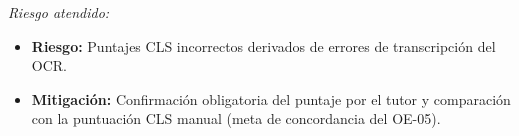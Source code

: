 \textit{Riesgo atendido:}
\begin{itemize}
    \item \textbf{Riesgo:} Puntajes CLS incorrectos derivados de errores de transcripción
    del OCR.
    \item \textbf{Mitigación:} Confirmación obligatoria del puntaje por el tutor y
    comparación con la puntuación CLS manual (meta de concordancia del OE-05).
\end{itemize}

